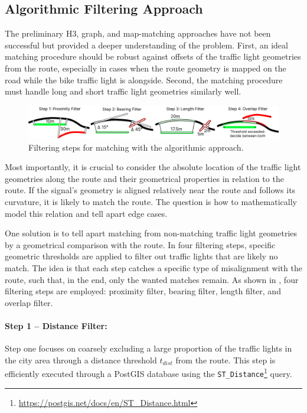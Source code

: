 \subsection{Algorithmic Filtering Approach}

The preliminary H3, graph, and map-matching approaches have not been successful but provided a deeper understanding of the problem. First, an ideal matching procedure should be robust against offsets of the traffic light geometries from the route, especially in cases when the route geometry is mapped on the road while the bike traffic light is alongside. Second, the matching procedure must handle long and short traffic light geometries similarly well. 

\begin{figure}[htbp]
\centering
\includegraphics[width=\linewidth]{images/sg-matching-filters.pdf}
\caption{Filtering steps for matching with the algorithmic approach.}
\label{fig:sg-matching-filters}
\end{figure}

Most importantly, it is crucial to consider the absolute location of the traffic light geometries along the route and their geometrical properties in relation to the route. If the signal's geometry is aligned relatively near the route and follows its curvature, it is likely to match the route. The question is how to mathematically model this relation and tell apart edge cases.

One solution is to tell apart matching from non-matching traffic light geometries by a geometrical comparison with the route. In four filtering steps, specific geometric thresholds are applied to filter out traffic lights that are likely no match. The idea is that each step catches a specific type of misalignment with the route, such that, in the end, only the wanted matches remain. As shown in , four filtering steps are employed: proximity filter, bearing filter, length filter, and overlap filter.

\paragraph{Step 1 -- Distance Filter:} Step one focuses on coarsely excluding a large proportion of the traffic lights in the city area through a distance threshold $t_{dist}$ from the route. This step is efficiently executed through a PostGIS database using the \texttt{ST\_Distance}\footnote{\url{https://postgis.net/docs/en/ST\_Distance.html}} query.


